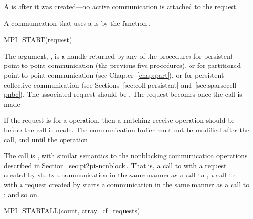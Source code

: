 A  is  after it was created---no
active communication is attached to the request.

A communication that uses a 
is  by the function .

\begin{funcdef}{MPI\_START}{(\mbox{request})}
\end{funcdef}

The argument, , is a handle returned by
any of the  procedures
for persistent point-to-point communication (the previous five procedures), or
for partitioned point-to-point communication (see Chapter~\ref{chap:part}), or
for persistent collective communication (see Sections~\ref{sec:coll-persistent} and~\ref{sec:sparsecoll-pnbc}).
The associated request should be .
The request becomes  once the call is made.

If the request is for a  operation, then
a matching receive operation should be  before the call is made.  The
communication buffer must not be
modified
after the call, and
until the operation .

The call is , with similar semantics to the nonblocking
communication operations described in
Section~\ref{sec:pt2pt-nonblock}.  That is,
a call to  with a
request created by 
starts a
communication in the same manner as a call to ;
a call to  with a
request created by 
starts a
communication in the same manner as a call to
; and so on.

\begin{funcdef}{MPI\_STARTALL}{(\mbox{count}, \mbox{array\_of\_requests})}
\end{funcdef}

